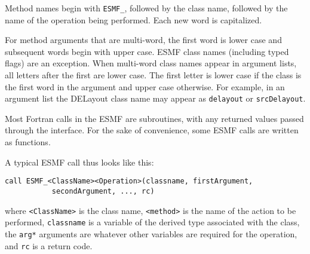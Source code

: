 Method names begin with {\tt ESMF\_}, followed by the class name, 
followed by the name of the operation being performed.  Each new 
word is capitalized. 

For method arguments that are multi-word, the first word is lower
case and subsequent words begin with upper case.  ESMF class 
names (including typed flags) are an exception.  When multi-word 
class names appear in argument lists, all letters after the first 
are lower case.  The first letter is lower case if the class is the
first word in the argument and upper case otherwise.  For 
example, in an argument list the DELayout class name may appear 
as {\tt delayout} or {\tt srcDelayout}.

Most Fortran calls in the ESMF are subroutines, with 
any returned values passed through the interface.  For the sake of 
convenience, some ESMF calls are written as functions.

A typical ESMF call thus looks like this:

\begin{verbatim}
call ESMF_<ClassName><Operation>(classname, firstArgument, 
           secondArgument, ..., rc)
\end{verbatim}

where \newline
{\tt <ClassName>} is the class name, \newline
{\tt <method>} is the name of the action to be performed, \newline 
{\tt classname} is a variable of the derived type associated 
with the class, \newline
the {\tt arg*} arguments are whatever other variables are required 
for the operation, \newline
and {\tt rc} is a return code. \newline



